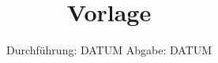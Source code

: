 



\subject{V000}  %
\title{Vorlage} %
\date{%
  Durchführung: DATUM
  \hspace{3em}
  Abgabe: DATUM
}



\maketitle
\thispagestyle{empty}
\tableofcontents
\newpage







\printbibliography{}


